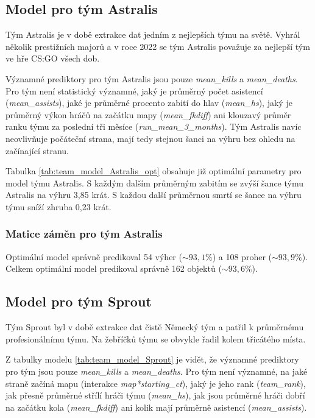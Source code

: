 \subsection{Model pro tým Astralis}
Tým Astralis je v době extrakce dat jedním z nejlepších týmu na světě. Vyhrál několik prestižních majorů a v roce 2022 se tým Astralis považuje za nejlepší tým
ve hře \ac{CS:GO} všech dob.



Významné prediktory pro tým Astralis jsou pouze \textit{mean\_kills} a \textit{mean\_deaths}.  Pro tým není statistický významné, jaký je průměrný počet asistencí
(\textit{mean\_assists}), jaké je průměrné procento zabití do hlav (\textit{mean\_hs}), jaký je průměrný výkon hráčů na začátku mapy (\textit{mean\_fkdiff}) ani klouzavý
průměr ranku týmu za poslední tři měsíce (\textit{run\_mean\_3\_months}). Tým Astralis navíc neovlivňuje počáteční strana, mají tedy stejnou šanci na výhru bez ohledu na 
začínající stranu.



Tabulka \ref{tab:team_model_Astralis_opt} obsahuje již optimální parametry pro model týmu Astralis. S každým dalším průměrným zabitím se zvýší šance
týmu Astralis na výhru 3,85 krát. S každou další průměrnou smrtí se šance na výhru týmu sníží zhruba 0,23 krát.

\subsubsection{Matice záměn pro tým Astralis}



Optimální model správně predikoval 54 výher ($\sim 93,1\%$) a 108 proher ($\sim 93,9\%$). Celkem optimální model predikoval správně 162 objektů ($\sim 93,6\%$).



\subsection{Model pro tým Sprout}
Tým Sprout byl v době extrakce dat čistě Německý tým a patřil k průměrnému profesionálnímu týmu. Na žebříčků týmu se obvykle řadil kolem třicátého místa.



Z tabulky modelu \ref{tab:team_model_Sprout} je vidět, že významné prediktory pro tým jsou pouze \textit{mean\_kills} a \textit{mean\_deaths}. Pro tým není významné,
na jaké straně začíná mapu (interakce \textit{map*starting\_ct}), jaký je jeho rank (\textit{team\_rank}), jak přesně průměrné střílí hráči týmu (\textit{mean\_hs}),
jak jsou průměrné hráči dobří na začátku kola (\textit{mean\_fkdiff}) ani kolik mají průměrně asistencí (\textit{mean\_assists}).

